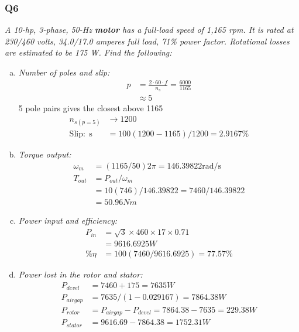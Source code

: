 \documentclass[a4paper,11pt]{article}
\begin{document}
\subsubsection*{Q6}

\textit{A 10-hp, 3-phase, 50-Hz \textbf{motor} has a full-load speed of 1,165 rpm. It is rated at 230/460 volts, 34.0/17.0 amperes full load, 71\% power factor. Rotational losses are estimated to be 175 W. Find the following:}

\begin{enumerate}[a)]
    \item \textit{Number of poles and slip:}\\
    \begin{align*}
        p &= \frac{2\cdot 60 \cdot f}{n_s} = \frac{6000}{1165}\\
        &\approx 5
    \end{align*}
    5 pole pairs gives the closest above 1165
    \begin{align*}
        n_{s(p=5)}&\rightarrow1200 \\
        \mathrm{Slip:\;s}&=100(1200-1165)/1200=2.9167\%
    \end{align*}

    \item \textit{Torque output:}\\
    \begin{align*}
        \omega_m &= (1165/50)2\pi = 146.39822 \mathrm{rad/s} \\
        T_{out} &= P_{out}/\omega_m \\
        &= 10(746)/146.39822=7460/146.39822
        \\&=50.96Nm
    \end{align*}

    \item \textit{Power input and efficiency:}\\
    \begin{align*}
        P_{in} &= \sqrt{3}\times460\times17\times0.71\\
        &=9616.6925W\\
        \%\eta &= 100(7460/9616.6925)=77.57\%
    \end{align*}

    \item \textit{Power lost in the rotor and stator:}\\
    \begin{align*}
        P_{devel} &= 7460+175=7635W\\ 
        P_{airgap} &= 7635/(1-0.029167)=7864.38W \\
        P_{rotor} &= P_{airgap}-P_{devel} = 7864.38-7635=229.38W \\
        P_{stator} &= 9616.69-7864.38=1752.31W\\\\
    \end{align*}
\end{enumerate}
\end{document}
